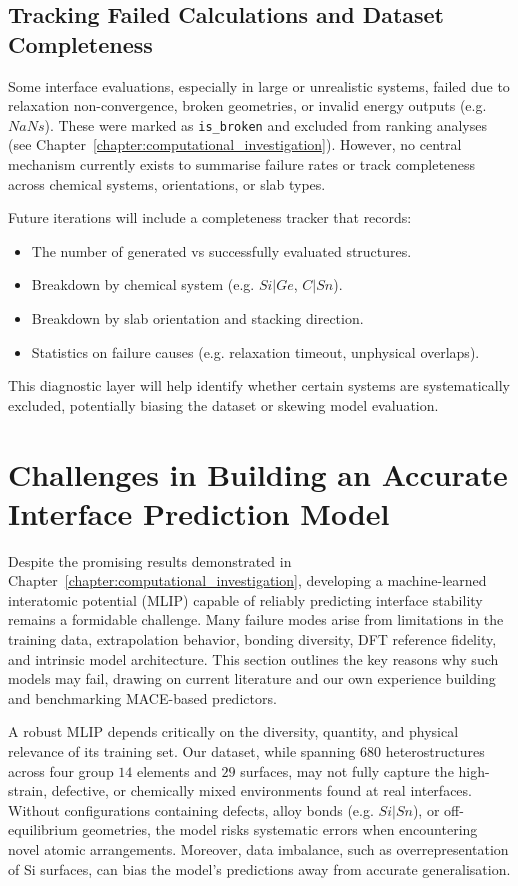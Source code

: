 \subsection*{Tracking Failed Calculations and Dataset Completeness}

Some interface evaluations, especially in large or unrealistic systems, failed due to relaxation non-convergence, broken geometries, or invalid energy outputs (e.g. $NaNs$).
These were marked as \texttt{is\_broken} and excluded from ranking analyses (see Chapter~\ref{chapter:computational_investigation}).
However, no central mechanism currently exists to summarise failure rates or track completeness across chemical systems, orientations, or slab types.

Future iterations will include a completeness tracker that records:

\begin{itemize}
    \item The number of generated vs successfully evaluated structures.
    \item Breakdown by chemical system (e.g. $Si|Ge$, $C|Sn$).
    \item Breakdown by slab orientation and stacking direction.
    \item Statistics on failure causes (e.g. relaxation timeout, unphysical overlaps).
\end{itemize}

This diagnostic layer will help identify whether certain systems are systematically excluded, potentially biasing the dataset or skewing model evaluation.

\section{Challenges in Building an Accurate Interface Prediction Model}\label{section:model_challenges}

Despite the promising results demonstrated in Chapter~\ref{chapter:computational_investigation}, developing a machine-learned interatomic potential (MLIP) capable of reliably predicting interface stability remains a formidable challenge.
Many failure modes arise from limitations in the training data, extrapolation behavior, bonding diversity, DFT reference fidelity, and intrinsic model architecture.
This section outlines the key reasons why such models may fail, drawing on current literature and our own experience building and benchmarking MACE-based predictors.

A robust MLIP depends critically on the diversity, quantity, and physical relevance of its training set\cite{Wang2024-tn, Deng2023-tg, Batzner2022-fd}.
Our dataset, while spanning 680 heterostructures across four group $14$ elements and $29$ surfaces, may not fully capture the high-strain, defective, or chemically mixed environments found at real interfaces.
Without configurations containing defects, alloy bonds (e.g. $Si|Sn$), or off-equilibrium geometries, the model risks systematic errors when encountering novel atomic arrangements.
Moreover, data imbalance, such as overrepresentation of Si surfaces, can bias the model's predictions away from accurate generalisation.

